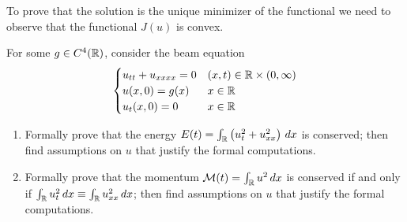 To prove that the solution is the unique minimizer of the functional we need to observe that the functional \(J(u)\) is convex.

\newpage
\begin{exercise}
    For some \(g \in C^4(\mathbb{R})\), consider the beam equation
    \[
        \begin{cases}
            u_{tt} + u_{xxxx} = 0 & (x, t) \in \mathbb{R} \times (0, \infty) \\
            u(x, 0) = g(x) & x \in \mathbb{R} \\
            u_t(x, 0) = 0 & x \in \mathbb{R}
        \end{cases}
    \]
    \begin{enumerate}
        \item Formally prove that the energy \(E(t) = \int_{\mathbb{R}} \left( u_t^2 + u_{xx}^2 \right) \, dx\) is conserved; then find assumptions on \(u\) that justify the formal computations.
        \item Formally prove that the momentum \(\mathcal{M}(t) = \int_{\mathbb{R}} u^2 \, dx\) is conserved if and only if \(\int_{\mathbb{R}} u_{t}^2 \, dx \equiv \int_{\mathbb{R}} u_{xx}^2 \, dx\); then find assumptions on \(u\) that justify the formal computations.
    \end{enumerate}
\end{exercise}

